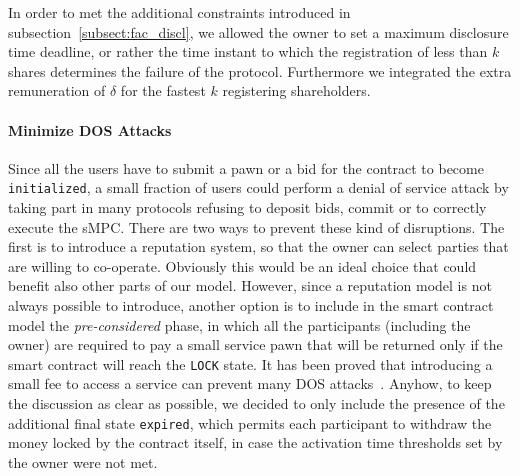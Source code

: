 In order to met the additional constraints introduced in subsection~\ref{subsect:fac_discl}, we allowed the owner to set a maximum disclosure time deadline, or rather the time instant to which the registration of less than $k$ shares determines the failure of the protocol. Furthermore we integrated the extra remuneration of $\delta$ for the fastest $k$ registering shareholders. 

\paragraph{Minimize DOS Attacks}

Since all the users have to submit a pawn or a bid for the contract to become \texttt{initialized}, a small fraction of users could perform a denial of service attack by taking part in many \shortname protocols refusing to deposit bids, commit or to correctly execute the sMPC. There are two ways to prevent these kind of disruptions. The first is to introduce a reputation system, so that the owner can select parties that are willing to co-operate. Obviously this would be an ideal choice that could benefit also other parts of our model. However, since a reputation model is not always possible to introduce, another option is to include in the smart contract model the {\em pre-considered} phase, in which all the participants (including the owner) are required to pay a small service pawn that will be returned only if the smart contract will reach the \texttt{LOCK} state. It has been proved that introducing a small fee to access a service can prevent many DOS attacks~\cite{ddos-payments,ddos-survey}. Anyhow, to keep the discussion as clear as possible, we decided to only include the presence of the additional final state \texttt{expired}, which permits each participant to withdraw the money locked by the contract itself, in case the activation time thresholds set by the owner were not met.  

